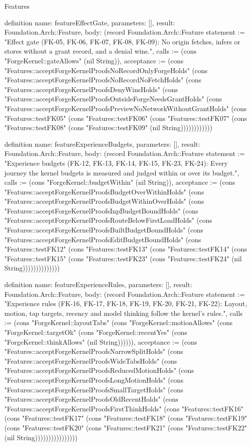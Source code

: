 \begin{lexlean}{Features}
\begin{semanticmodule}
definition{
  name: featureEffectGate,
  parameters: [],
  result: Foundation.Arch::Feature,
  body: (record Foundation.Arch::Feature {statement := "Effect gate (FK-05, FK-06, FK-07, FK-08, FK-09): No origin fetches, infers or stores without a grant record, and a denial wins.", calls := (cons "ForgeKernel::gateAllows" (nil String)), acceptance := (cons "Features::acceptForgeKernelProofsNoRecordOnlyForgeHolds" (cons "Features::acceptForgeKernelProofsNoRecordNoFetchHolds" (cons "Features::acceptForgeKernelProofsDenyWinsHolds" (cons "Features::acceptForgeKernelProofsOutsideForgeNeedsGrantHolds" (cons "Features::acceptForgeKernelProofsPreviewNoNetworkWithoutGrantHolds" (cons "Features::testFK05" (cons "Features::testFK06" (cons "Features::testFK07" (cons "Features::testFK08" (cons "Features::testFK09" (nil String)))))))))))})
}

definition{
  name: featureExperienceBudgets,
  parameters: [],
  result: Foundation.Arch::Feature,
  body: (record Foundation.Arch::Feature {statement := "Experience budgets (FK-12, FK-13, FK-14, FK-15, FK-23, FK-24): Every journey the kernel budgets is measured and judged within or over its budget.", calls := (cons "ForgeKernel::budgetWithin" (nil String)), acceptance := (cons "Features::acceptForgeKernelProofsBudgetOverWithinHolds" (cons "Features::acceptForgeKernelProofsBudgetWithinOverHolds" (cons "Features::acceptForgeKernelProofsInpBudgetBoundHolds" (cons "Features::acceptForgeKernelProofsRouteBelowFirstLoadHolds" (cons "Features::acceptForgeKernelProofsBuiltBudgetBoundHolds" (cons "Features::acceptForgeKernelProofsEditBudgetBoundHolds" (cons "Features::testFK12" (cons "Features::testFK13" (cons "Features::testFK14" (cons "Features::testFK15" (cons "Features::testFK23" (cons "Features::testFK24" (nil String)))))))))))))})
}

definition{
  name: featureExperienceRules,
  parameters: [],
  result: Foundation.Arch::Feature,
  body: (record Foundation.Arch::Feature {statement := "Experience rules (FK-16, FK-17, FK-18, FK-19, FK-20, FK-21, FK-22): Layout, motion, tap targets, recency and model thinking follow the kernel's rules.", calls := (cons "ForgeKernel::layoutTabs" (cons "ForgeKernel::motionAllows" (cons "ForgeKernel::targetOk" (cons "ForgeKernel::recentYes" (cons "ForgeKernel::thinkAllows" (nil String)))))), acceptance := (cons "Features::acceptForgeKernelProofsNarrowSplitHolds" (cons "Features::acceptForgeKernelProofsWideTabsHolds" (cons "Features::acceptForgeKernelProofsReducedMotionHolds" (cons "Features::acceptForgeKernelProofsLongMotionHolds" (cons "Features::acceptForgeKernelProofsSmallTargetHolds" (cons "Features::acceptForgeKernelProofsOldRecentHolds" (cons "Features::acceptForgeKernelProofsFirstThinkHolds" (cons "Features::testFK16" (cons "Features::testFK17" (cons "Features::testFK18" (cons "Features::testFK19" (cons "Features::testFK20" (cons "Features::testFK21" (cons "Features::testFK22" (nil String)))))))))))))))})
}


\end{semanticmodule}
\end{lexlean}
